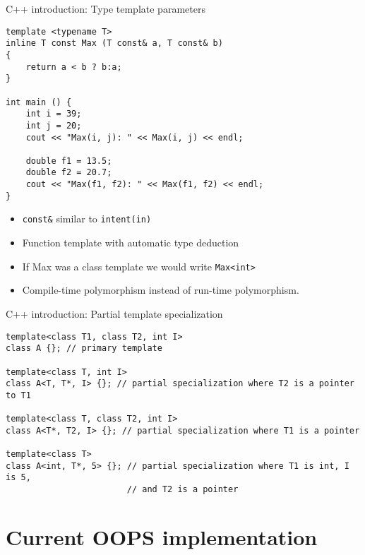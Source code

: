 \documentclass[9pt]{beamer}
\begin{document}
\begin{frame}[fragile]{C++ introduction: Type template parameters}


\begin{lstlisting}
template <typename T>
inline T const Max (T const& a, T const& b)
{
    return a < b ? b:a;
}

int main () {
    int i = 39;
    int j = 20;
    cout << "Max(i, j): " << Max(i, j) << endl;

    double f1 = 13.5;
    double f2 = 20.7;
    cout << "Max(f1, f2): " << Max(f1, f2) << endl;
}
\end{lstlisting}
\begin{itemize}
  \item \lstinline|const&| similar to \lstinline|intent(in)|
  \item Function template with automatic type deduction
  \item If Max was a class template we would write  \lstinline|Max<int>|
  \item Compile-time polymorphism instead of run-time polymorphism.

\end{itemize}
\end{frame}
\begin{frame}[fragile]{C++ introduction: Partial template specialization}

\begin{lstlisting}
template<class T1, class T2, int I>
class A {}; // primary template

template<class T, int I>
class A<T, T*, I> {}; // partial specialization where T2 is a pointer to T1

template<class T, class T2, int I>
class A<T*, T2, I> {}; // partial specialization where T1 is a pointer

template<class T>
class A<int, T*, 5> {}; // partial specialization where T1 is int, I is 5,
                        // and T2 is a pointer

\end{lstlisting}
\end{frame}

%
\section{Current OOPS implementation}
\end{document}
